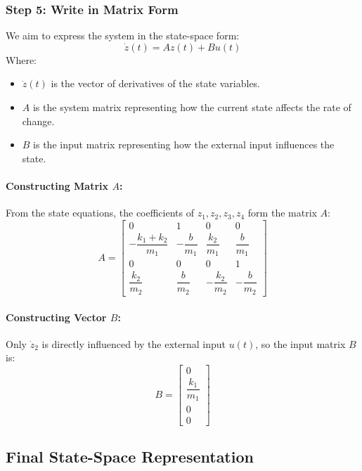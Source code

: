 \documentclass{article}
\begin{document}
\subsubsection*{Step 5: Write in Matrix Form}

We aim to express the system in the state-space form:
\[
\dot{z}(t) = A z(t) + B u(t)
\]
Where:
\begin{itemize}
    \item \( \dot{z}(t) \) is the vector of derivatives of the state variables.
    \item \( A \) is the system matrix representing how the current state affects the rate of change.
    \item \( B \) is the input matrix representing how the external input influences the state.
\end{itemize}

\paragraph{Constructing Matrix \( A \):}

From the state equations, the coefficients of \( z_1, z_2, z_3, z_4 \) form the matrix \( A \):
\[
A = \begin{bmatrix}
0 & 1 & 0 & 0 \\
-\dfrac{k_1 + k_2}{m_1} & -\dfrac{b}{m_1} & \dfrac{k_2}{m_1} & \dfrac{b}{m_1} \\
0 & 0 & 0 & 1 \\
\dfrac{k_2}{m_2} & \dfrac{b}{m_2} & -\dfrac{k_2}{m_2} & -\dfrac{b}{m_2}
\end{bmatrix}
\]

\paragraph{Constructing Vector \( B \):}

Only \( \dot{z}_2 \) is directly influenced by the external input \( u(t) \), so the input matrix \( B \) is:
\[
B = \begin{bmatrix}
0 \\
\dfrac{k_1}{m_1} \\
0 \\
0
\end{bmatrix}
\]

\subsection*{Final State-Space Representation}
\end{document}
